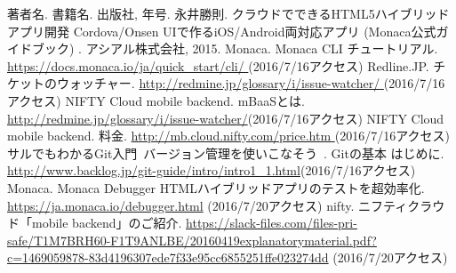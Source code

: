 \documentclass[openany,11pt,papersize]{jsbook}
\begin{document}
%
\maketitle

\frontmatter



\tableofcontents%


\mainmatter%



















\begin{appendix}





\end{appendix}



\begin{thebibliography}{9}
 著者名. 書籍名. 出版社,  年号.
 永井勝則. クラウドでできるHTML5ハイブリッドアプリ開発 Cordova/Onsen UIで作るiOS/Android両対応アプリ (Monaca公式ガイドブック) . アシアル株式会社, 2015.
 Monaca. Monaca CLI チュートリアル. \url{https://docs.monaca.io/ja/quick_start/cli/ }(2016/7/16アクセス)
 Redline.JP. チケットのウォッチャー. \url{http://redmine.jp/glossary/i/issue-watcher/ }(2016/7/16アクセス)
 NIFTY Cloud mobile backend. mBaaSとは. \url{http://redmine.jp/glossary/i/issue-watcher/}(2016/7/16アクセス)
 NIFTY Cloud mobile backend. 料金. \url{http://mb.cloud.nifty.com/price.htm }(2016/7/16アクセス)
 サルでもわかるGit入門~バージョン管理を使いこなそう~. Gitの基本 はじめに. \url{http://www.backlog.jp/git-guide/intro/intro1_1.html}(2016/7/16アクセス)
 Monaca. Monaca Debugger HTMLハイブリッドアプリのテストを超効率化. \url{https://ja.monaca.io/debugger.html} (2016/7/20アクセス)
 nifty. ニフティクラウド「mobile backend」のご紹介. \url{https://slack-files.com/files-pri-safe/T1M7BRH60-F1T9ANLBE/20160419explanatorymaterial.pdf?c=1469059878-83d4196307ede7f33e95cc6855251ffe023274dd} (2016/7/20アクセス)
\end{thebibliography}
\end{document}
